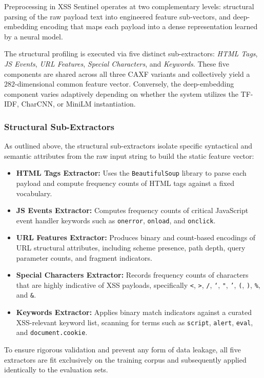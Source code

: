 \documentclass[11pt,a4paper]{article}
\begin{document}
Preprocessing in XSS Sentinel operates at two complementary levels: structural parsing of the raw
payload text into engineered feature sub-vectors, and deep-embedding encoding that maps each payload
into a dense representation learned by a neural model.  

The structural profiling is executed via five distinct sub-extractors: 
\textit{HTML Tags}, \textit{JS Events}, \textit{URL Features}, \textit{Special Characters}, and \textit{Keywords}. 
These five components are shared across all three CAXF variants and collectively yield a $282$-dimensional common feature vector. 
Conversely, the deep-embedding component varies adaptively depending on whether the system utilizes the TF-IDF, CharCNN, or MiniLM instantiation.

\subsubsection{Structural Sub-Extractors}
As outlined above, the structural sub-extractors isolate specific syntactical and semantic attributes from the raw input string to build the static feature vector:

\begin{itemize}
    \item \textbf{HTML Tags Extractor:} Uses the \texttt{BeautifulSoup} library to parse each payload and compute frequency counts of HTML tags against a fixed vocabulary.
    \item \textbf{JS Events Extractor:} Computes frequency counts of critical JavaScript event handler keywords such as \texttt{onerror}, \texttt{onload}, and \texttt{onclick}.
    \item \textbf{URL Features Extractor:} Produces binary and count-based encodings of URL structural attributes, including scheme presence, path depth, query parameter counts, and fragment indicators.
    \item \textbf{Special Characters Extractor:} Records frequency counts of characters that are highly indicative of XSS payloads, specifically \texttt{<}, \texttt{>}, \texttt{/}, \texttt{`}, \texttt{"}, \texttt{'}, \texttt{(}, \texttt{)}, \texttt{\%}, and \texttt{\&}.
    \item \textbf{Keywords Extractor:} Applies binary match indicators against a curated XSS-relevant keyword list, scanning for terms such as \texttt{script}, \texttt{alert}, \texttt{eval}, and \texttt{document.cookie}.
\end{itemize}
To ensure rigorous validation and prevent any form of data leakage, all five extractors are fit exclusively on the training corpus and subsequently applied identically to the evaluation sets.
\end{document}
